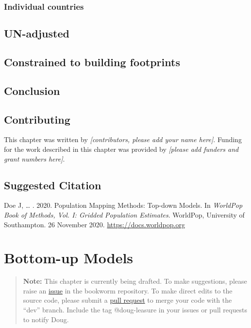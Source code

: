 \documentclass[]{book}
\begin{document}
\subsection{Individual countries}\label{individual-countries}

\section{UN-adjusted}\label{un-adjusted}

\section{Constrained to building
footprints}\label{constrained-to-building-footprints}

\section{Conclusion}\label{conclusion}

\section*{Contributing}\label{contributing-1}

This chapter was written by \emph{{[}contributors, please add your name
here{]}}. Funding for the work described in this chapter was provided by
\emph{{[}please add funders and grant numbers here{]}}.

\section*{Suggested Citation}\label{suggested-citation-1}

Doe J, \ldots{} . 2020. Population Mapping Methods: Top-down Models. In
\emph{WorldPop Book of Methods, Vol. I: Gridded Population Estimates}.
WorldPop, University of Southampton. 26 November 2020.
\url{https://docs.worldpop.org}

\hypertarget{bottom-up-models}{\chapter{Bottom-up
Models}\label{bottom-up-models}}

\begin{quote}
\textbf{Note:} This chapter is currently being drafted. To make
suggestions, please raise an
\href{https://github.com/wpgp/bookworm/issues}{issue} in the bookworm
repository. To make direct edits to the source code, please submit a
\href{https://github.com/wpgp/bookworm/pulls}{pull request} to merge
your code with the ``dev'' branch. Include the tag @doug-leasure in your
issues or pull requests to notify Doug.
\end{quote}
\end{document}
